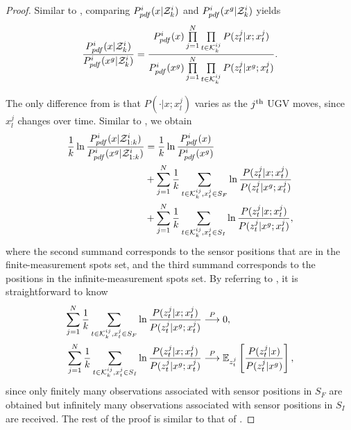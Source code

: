 	\begin{proof}		
		Similar to , comparing $P^i_{pdf}(x|\mathcal{Z}^i_k)$ and $P^i_{pdf}(x^g|\mathcal{Z}^i_k)$ yields		
		\small\begin{equation}\label{eqn:cmp2}
		\frac{P^i_{pdf}(x|\mathcal{Z}^i_k)}{P^i_{pdf}(x^g|\mathcal{Z}^i_k)}=\frac{P^i_{pdf}(x)\prod\limits_{j=1}^{N}\prod\limits_{t\in\mathcal{K}^{ij}_{k}}P(z^j_t|x;x^j_t)}{P^i_{pdf}(x^g)\prod\limits_{j=1}^{N}\prod\limits_{t\in\mathcal{K}^{ij}_{k}}P(z^j_t|x^g;x^j_t)}.
		\end{equation}\normalsize
			
		\textcolor{\revcol}{
		The only difference from  is that $P(\cdot|x;x^j_l)$ varies as the $j^\text{th}$ UGV moves, since $x^j_l$ changes over time.
		Similar to , we obtain 
		\begin{equation*}
		\begin{split}
		\frac{1}{k}\ln\frac{P^i_{pdf}(x|\mathcal{Z}^i_{1:k})}{P^i_{pdf}(x^g|\mathcal{Z}^i_{1:k})}&=\frac{1}{k}\ln\frac{P^i_{pdf}(x)}{P^i_{pdf}(x^g)}\\
		&+\sum\limits_{j=1}^{N}\frac{1}{k}\sum\limits_{t\in\mathcal{K}^{ij}_{k},x^j_t\in S_F}\ln\frac{P(z^j_t|x;x^j_t)}{P(z^j_t|x^g;x^j_t)}\\
		&+\sum\limits_{j=1}^{N}\frac{1}{k}\sum\limits_{t\in\mathcal{K}^{ij}_{k},x^j_t\in S_I}\ln\frac{P(z^j_t|x;x^j_t)}{P(z^j_t|x^g;x^j_t)},
		\end{split}		
		\end{equation*}
		where the second summand corresponds to the sensor positions that are in the finite-measurement spots set, and the third summand corresponds to the positions in the infinite-measurement spots set. 
		By referring to , it is straightforward to know
		\begin{equation*}
		\begin{split}
		\sum\limits_{j=1}^{N}\frac{1}{k}\sum\limits_{t\in\mathcal{K}^{ij}_{k},x^j_t\in S_F}\ln\frac{P(z^j_t|x;x^j_t)}{P(z^j_t|x^g;x^j_t)}&\overset{P}{\longrightarrow} 0,\\
		\sum\limits_{j=1}^{N}\frac{1}{k}\sum\limits_{t\in\mathcal{K}^{ij}_{k},x^j_t\in S_I}\ln\frac{P(z^j_t|x;x^j_t)}{P(z^j_t|x^g;x^j_t)}&\overset{P}{\longrightarrow} \mathbb{E}_{z^j_t} \left[\frac{P(z^j_t|x)}{P(z^j_t|x^g)}\right],
		\end{split}		
		\end{equation*}
		since only finitely many observations associated with sensor positions in $S_F$ are obtained but infinitely many observations associated with sensor positions in $S_I$ are received.
		The rest of the proof is similar to that of .}
	\end{proof}
			
